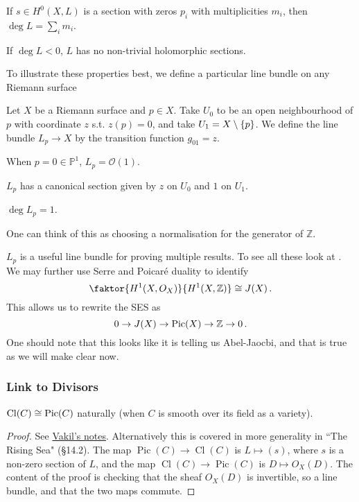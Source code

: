 \documentclass{article}
\begin{document}
\begin{prop}
	If $s \in H^0(X,L)$ is a section with zeros $p_i$ with multiplicities $m_i$, then $\deg L = \sum_i m_i$. 
\end{prop}
\begin{corollary}
	If $\deg L < 0$, $L$ has no non-trivial holomorphic sections. 
\end{corollary}
To illustrate these properties best, we define a particular line bundle on any Riemann surface 
\begin{definition}
	Let $X$ be a Riemann surface and $p \in X$. Take $U_0$ to be an open neighbourhood of $p$ with coordinate $z$ s.t. $z(p)=0$, and take $U_1 = X \setminus \left\{ p \right\}$. We define the line bundle $L_p \to X$ by the transition function $g_{01} = z$.  
\end{definition}

\begin{example}
	When $p =0 \in \mathbb{P}^1$, $L_p = \mathcal{O}(1)$. 
\end{example}

\begin{lemma}
	$L_p$ has a canonical section given by $z$ on $U_0$ and $1$ on $U_1$. 
\end{lemma}

\begin{prop}
	$\deg L_p = 1$. 
\end{prop}
\begin{remark}
	One can think of this as choosing a normalisation for the generator of $\mathbb{Z}$. 
\end{remark}
$L_p$ is a useful line bundle for proving multiple results. To see all these look at \cite{Hitchin1999}. \\
We may further use Serre and Poicar\'e duality to identify 
\[
\faktor{H^1(X,O_X)}{H^1(X,\mathbb{Z})} \cong J(X) \, .
\]
This allows us to rewrite the SES as 
\[
0 \to J(X) \to \operatorname{Pic}(X) \to \mathbb{Z} \to 0 \, .
\]
One should note that this looks like it is telling us Abel-Jaocbi, and that is true as we will make clear now.

 
\subsubsection{Link to Divisors}

\begin{theorem}
	$\operatorname{Cl}(C) \cong \operatorname{Pic}(C)$ naturally (when $C$ is smooth over its field as a variety). 
\end{theorem}
\begin{proof}
	See \href{https://math.stanford.edu/~vakil/725/class23.pdf}{Vakil's notes}. Alternatively this is covered in more generality in ``The Rising Sea" \cite{Vakil2010} (\S 14.2). The map $\operatorname{Pic}(C) \to \operatorname{Cl}(C)$ is $L\mapsto (s)$, where $s$ is a non-zero section of $L$, and the map $\operatorname{Cl}(C) \to \operatorname{Pic}(C)$ is $D \mapsto O_X(D)$. The content of the proof is checking that the sheaf $O_X(D)$ is invertible, so a line bundle, and that the two maps commute.  
\end{proof}
\end{document}
